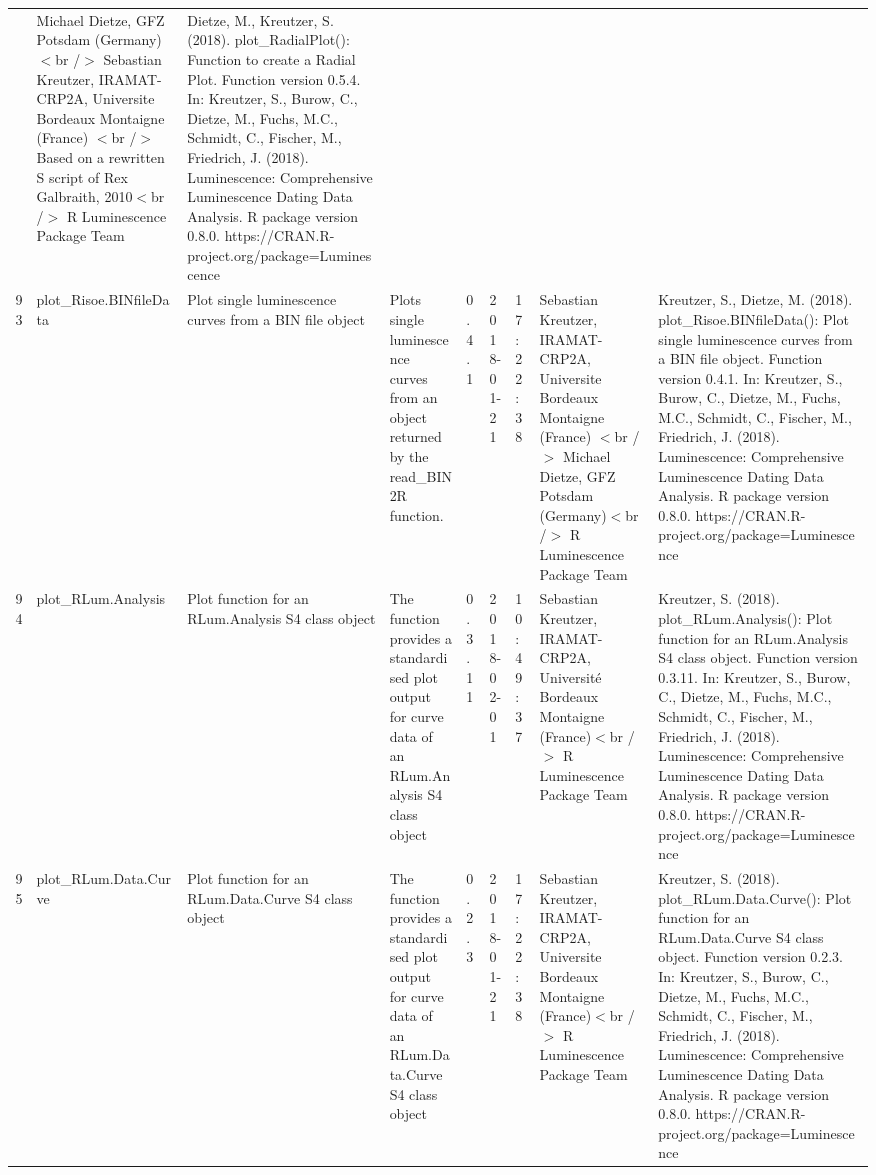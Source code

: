 \begin{table}[ht]
\begin{tabular}{rllllllll}
 & Michael Dietze, GFZ Potsdam (Germany) $<$br /$>$ Sebastian Kreutzer, IRAMAT-CRP2A, Universite Bordeaux Montaigne (France) $<$br /$>$ Based on a rewritten S script of Rex Galbraith, 2010$<$br /$>$  R Luminescence Package Team & Dietze, M., Kreutzer, S. (2018). plot\_RadialPlot(): Function to create a Radial Plot. Function version 0.5.4. In: Kreutzer, S., Burow, C., Dietze, M., Fuchs, M.C., Schmidt, C., Fischer, M., Friedrich, J. (2018). Luminescence: Comprehensive Luminescence Dating Data Analysis. R package version 0.8.0. https://CRAN.R-project.org/package=Luminescence
 \\ 
  93 & plot\_Risoe.BINfileData & Plot single luminescence curves from a BIN file object & Plots single luminescence curves from an object returned by the read\_BIN2R  function. & 0.4.1 & 2018-01-21 & 17:22:38
 & Sebastian Kreutzer, IRAMAT-CRP2A, Universite Bordeaux Montaigne (France) $<$br /$>$ Michael Dietze, GFZ Potsdam (Germany)$<$br /$>$  R Luminescence Package Team & Kreutzer, S., Dietze, M. (2018). plot\_Risoe.BINfileData(): Plot single luminescence curves from a BIN file object. Function version 0.4.1. In: Kreutzer, S., Burow, C., Dietze, M., Fuchs, M.C., Schmidt, C., Fischer, M., Friedrich, J. (2018). Luminescence: Comprehensive Luminescence Dating Data Analysis. R package version 0.8.0. https://CRAN.R-project.org/package=Luminescence
 \\ 
  94 & plot\_RLum.Analysis & Plot function for an RLum.Analysis S4 class object & The function provides a standardised plot output for curve data of an RLum.Analysis S4 class object & 0.3.11 & 2018-02-01 & 10:49:37
 & Sebastian Kreutzer, IRAMAT-CRP2A, Université Bordeaux Montaigne (France)$<$br /$>$  R Luminescence Package Team & Kreutzer, S. (2018). plot\_RLum.Analysis(): Plot function for an RLum.Analysis S4 class object. Function version 0.3.11. In: Kreutzer, S., Burow, C., Dietze, M., Fuchs, M.C., Schmidt, C., Fischer, M., Friedrich, J. (2018). Luminescence: Comprehensive Luminescence Dating Data Analysis. R package version 0.8.0. https://CRAN.R-project.org/package=Luminescence
 \\ 
  95 & plot\_RLum.Data.Curve & Plot function for an RLum.Data.Curve S4 class object & The function provides a standardised plot output for curve data of an RLum.Data.Curve S4 class object & 0.2.3 & 2018-01-21 & 17:22:38
 & Sebastian Kreutzer, IRAMAT-CRP2A, Universite Bordeaux Montaigne (France)$<$br /$>$  R Luminescence Package Team & Kreutzer, S. (2018). plot\_RLum.Data.Curve(): Plot function for an RLum.Data.Curve S4 class object. Function version 0.2.3. In: Kreutzer, S., Burow, C., Dietze, M., Fuchs, M.C., Schmidt, C., Fischer, M., Friedrich, J. (2018). Luminescence: Comprehensive Luminescence Dating Data Analysis. R package version 0.8.0. https://CRAN.R-project.org/package=Luminescence

\end{tabular}
\end{table}

